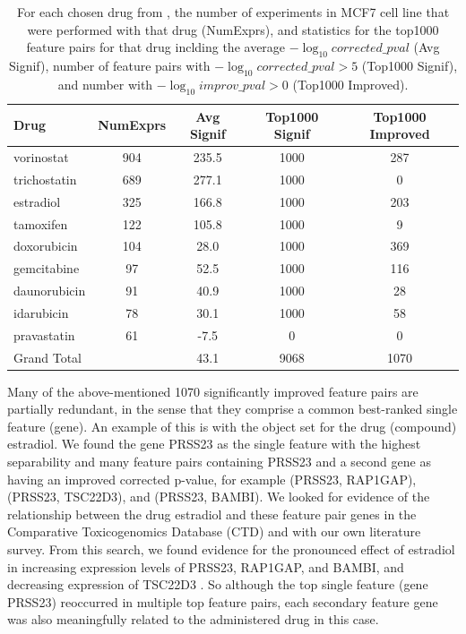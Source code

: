 \begin{table}[t!]
\centering
\small
\begin{tabular}{|l|c|c|c|c|}
\hline
 Drug & NumExprs & Avg Signif & Top1000 Signif & Top1000 Improved\\
\hline
vorinostat & 904 & 235.5 & 1000 & 287\\
\hline
trichostatin & 689 & 277.1 & 1000 & 0\\
\hline
estradiol & 325 & 166.8 & 1000 & 203\\
\hline
tamoxifen & 122 & 105.8 & 1000 & 9\\
\hline
doxorubicin & 104 & 28.0 & 1000 & 369\\
\hline
gemcitabine & 97 & 52.5 & 1000 & 116\\
\hline
daunorubicin & 91 & 40.9 & 1000 & 28\\
\hline
idarubicin & 78 & 30.1 & 1000 & 58\\
\hline
pravastatin & 61 & -7.5 & 0 & 0\\
\hline
Grand Total &  & 43.1 & 9068 & 1070\\
\hline
 \end{tabular}
\caption{For each chosen drug from \lincs, the number of experiments in MCF7 cell line that were performed with that drug (NumExprs), and statistics for the top1000 feature pairs for that drug inclding the average $-\log_{10} corrected\_pval$ (Avg Signif), number of feature pairs with $-\log_{10} corrected\_pval > 5$ (Top1000 Signif), and number with $-\log_{10} improv\_pval > 0$ (Top1000 Improved).}
\label{tbl:selected_fps}
\vspace{-18pt}
\end{table}


Many of the above-mentioned 1070 significantly improved feature pairs are partially redundant, in the sense that they comprise a common best-ranked single feature (gene). An example of this is with the object set for the drug (compound) estradiol. We found the gene PRSS23 as the single feature with the highest separability and many feature pairs containing PRSS23 and a second gene as having an improved corrected p-value, for example (PRSS23, RAP1GAP), (PRSS23, TSC22D3), and (PRSS23, BAMBI). We looked for evidence of the relationship between the drug estradiol and these feature pair genes in the Comparative Toxicogenomics Database (CTD)  and with our own literature survey. From this search, we found evidence for the pronounced effect of estradiol in increasing expression levels of PRSS23, RAP1GAP, and BAMBI, and decreasing expression of TSC22D3 . So although the top single feature (gene PRSS23) reoccurred in multiple top feature pairs, each secondary feature gene was also meaningfully related to the administered drug in this case.

